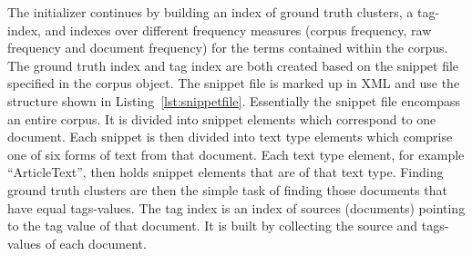 The initializer continues by building an index of ground truth clusters, a tag-index, and indexes over different frequency measures (corpus frequency, raw frequency and document frequency) for the terms contained within the corpus. The ground truth index and tag index are both created based on the snippet file specified in the corpus object. The snippet file is marked up in XML and use the structure shown in Listing~\ref{lst:snippetfile}. Essentially the snippet file encompass an entire corpus. It is divided into snippet elements which correspond to one document. Each snippet is then divided into text type elements which comprise one of six forms of text from that document. Each text type element, for example ``ArticleText'', then holds snippet elements that are of that text type. Finding ground truth clusters are then the simple task of finding those documents that have equal tags-values. The tag index is an index of sources (documents) pointing to the tag value of that document. It is built by collecting the source and tags-values of each document.

